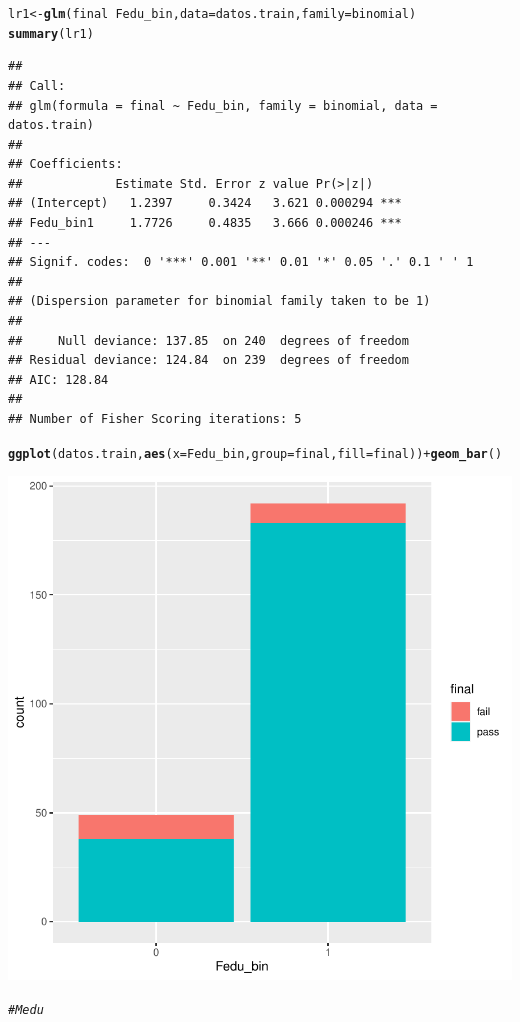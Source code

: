 \documentclass{article}\usepackage[]{graphicx}\usepackage[]{xcolor}
\makeatletter
\newcommand{\hlcom}[1]{\textcolor[rgb]{0.678,0.584,0.686}{\textit{#1}}}%
\newcommand{\hlopt}[1]{\textcolor[rgb]{0,0,0}{#1}}%
\newcommand{\hlstd}[1]{\textcolor[rgb]{0.345,0.345,0.345}{#1}}%
\newcommand{\hlkwb}[1]{\textcolor[rgb]{0.69,0.353,0.396}{#1}}%
\newcommand{\hlkwc}[1]{\textcolor[rgb]{0.333,0.667,0.333}{#1}}%
\newcommand{\hlkwd}[1]{\textcolor[rgb]{0.737,0.353,0.396}{\textbf{#1}}}%
\newenvironment{kframe}{%
 \def\at@end@of@kframe{}%
 \ifinner\ifhmode%
  \def\at@end@of@kframe{\end{minipage}}%
  \begin{minipage}{\columnwidth}%
 \fi\fi%
 \def\FrameCommand##1{\hskip\@totalleftmargin \hskip-\fboxsep
 \colorbox{shadecolor}{##1}\hskip-\fboxsep
     \hskip-\linewidth \hskip-\@totalleftmargin \hskip\columnwidth}%
 \MakeFramed {\advance\hsize-\width
   \@totalleftmargin\z@ \linewidth\hsize
   \@setminipage}}%
 {\par\unskip\endMakeFramed%
 \at@end@of@kframe}
\newenvironment{knitrout}{}{} %
\makeatother
\begin{document}
\begin{knitrout}
\begin{kframe}
\begin{alltt}
\hlstd{lr1} \hlkwb{<-} \hlkwd{glm}\hlstd{(final} \hlopt{~} \hlstd{Fedu_bin ,} \hlkwc{data}\hlstd{= datos.train,}\hlkwc{family}\hlstd{=binomial)}
\hlkwd{summary}\hlstd{(lr1)}
\end{alltt}
\begin{verbatim}
## 
## Call:
## glm(formula = final ~ Fedu_bin, family = binomial, data = datos.train)
## 
## Coefficients:
##             Estimate Std. Error z value Pr(>|z|)    
## (Intercept)   1.2397     0.3424   3.621 0.000294 ***
## Fedu_bin1     1.7726     0.4835   3.666 0.000246 ***
## ---
## Signif. codes:  0 '***' 0.001 '**' 0.01 '*' 0.05 '.' 0.1 ' ' 1
## 
## (Dispersion parameter for binomial family taken to be 1)
## 
##     Null deviance: 137.85  on 240  degrees of freedom
## Residual deviance: 124.84  on 239  degrees of freedom
## AIC: 128.84
## 
## Number of Fisher Scoring iterations: 5
\end{verbatim}
\begin{alltt}
\hlkwd{ggplot}\hlstd{(datos.train,} \hlkwd{aes}\hlstd{(}\hlkwc{x}\hlstd{=Fedu_bin,} \hlkwc{group}\hlstd{=final,}\hlkwc{fill}\hlstd{=final))} \hlopt{+} \hlkwd{geom_bar}\hlstd{()}
\end{alltt}
\end{kframe}

{\centering \includegraphics[width=.6\linewidth]{figure/LR1-SOLUCION-Rnwauto-report-3} 

}


\begin{kframe}\begin{alltt}
\hlcom{# Medu}


\end{alltt}
\end{kframe}
\end{knitrout}
\end{document}
